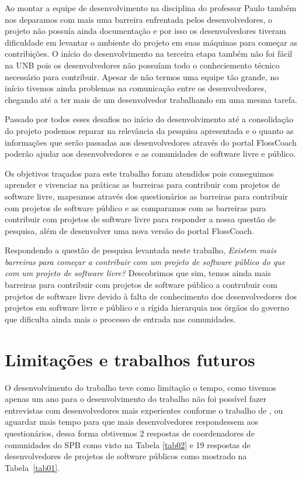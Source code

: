 Ao montar a equipe de desenvolvimento na disciplina do professor Paulo também nos deparamos
com mais uma barreira enfrentada pelos desenvolvedores, o projeto não possuía ainda 
documentação e por isso os desenvolvedores tiveram dificuldade em levantar o ambiente 
do projeto em suas máquinas para começar as contribições. O início do desenvolvimento
na terceira etapa também não foi fácil na UNB pois os desenvolvedores não possuíam
todo o conheciemento técnico necessário para contribuir.
Apesar de não termos uma equipe tão grande, no início tivemos ainda problemas na
comunicação entre os desenvolvedores, chegando até a ter mais de um desenvolvedor 
trabalhando em uma mesma tarefa.

Passado por todos esses desafios no início do desenvolvimento até a consolidação
do projeto podemos reparar na relevância da pesquisa apresentada e o quanto as
informações que serão passadas aos desenvolvedores através do portal FlossCoach poderão
ajudar aos desenvolvedores e as comunidades de software livre e público.

Os objetivos traçados para este trabalho foram atendidos pois conseguimos aprender
e vivenciar na práticas as barreiras para contribuir com projetos de software livre,
mapeamos através dos questionários as barreiras para contribuir com projetos de 
software público e as comparamos com as barreiras para contribuir com projetos
de software livre para responder a nossa questão de pesquisa, além de desenvolver 
uma nova versão do portal FlossCoach. 

Respondendo a questão de pesquisa levantada neste trabalho, \textit{Existem mais barreiras para 
começar a contribuir com um projeto de software público do que com um projeto de software 
livre?} Descobrimos que sim,
temos ainda mais barreiras para contribuir com projetos de software público a contrubuir
com projetos de software livre devido à falta de conhecimento dos desenvolvedores
dos projetos em software livre e público e a rígida hierarquia nos órgãos do governo
que dificulta ainda mais o processo de entrada nas comunidades.

\section{Limitações e trabalhos futuros}

O desenvolvimento do trabalho teve como limitação o tempo, como tivemos apenas um ano
para o desenvolvimento do trabalho não foi possível fazer entrevistas com desenvolvedores mais
experientes conforme o trabalho de , ou aguardar mais 
tempo para que mais desenvolvedores respondessem aos questionários,
dessa forma obtivemos 2 respostas de coordenadores de comunidades do SPB como visto na Tabela
\ref{tab02} e 19 respostas de desenvolvedores de projetos de software públicos como mostrado
na Tabela~\ref{tab01}.

